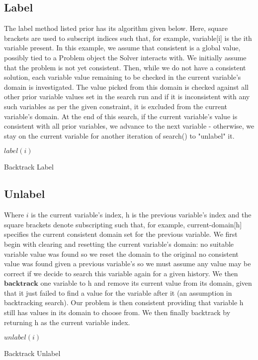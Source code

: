 \documentclass{article}
\begin{document}
\subsection*{Label}
The label method listed prior has its algorithm given below. Here, square brackets are used to subscript indices such that, for example, variable[i] is the ith variable present. In this example, we assume that consistent is a global value, possibly tied to a Problem object the Solver interacts with. We initially assume that the problem is not yet consistent. Then, while we do not have a consistent solution, each variable value remaining to be checked in the current variable's domain is investigated. The value picked from this domain is checked against all other prior variable values set in the search run and if it is inconsistent with any such variables as per the given constraint, it is excluded from the current variable's domain. At the end of this search, if the current variable's value is consistent with all prior variables, we advance to the next variable - otherwise, we stay on the current variable for another iteration of search() to "unlabel" it.
\begin{algorithm}[!htpb]
\DontPrintSemicolon
\nl $label(i)$\;
\nl {}
\caption{Backtrack Label}
\label{btLabel}
\end{algorithm}
\subsection*{Unlabel}
Where $i$ is the current variable's index, h is the previous variable's index and the square brackets denote subscripting such that, for example, current-domain[h] specifies the current consistent domain set for the previous variable. We first begin with clearing and resetting the current variable's domain: no suitable variable value was found so we reset the domain to the original no consistent value was found given a previous variable's so we must assume any value may be correct if we decide to search this variable again for a given history. We then $\textbf{backtrack}$ one variable to h and remove its current value from its domain, given that it just failed to find a value for the variable after it (an assumption in backtracking search). Our problem is then consistent providing that variable h still has values in its domain to choose from. We then finally backtrack by returning h as the current variable index.
\begin{algorithm}
\DontPrintSemicolon
\nl $unlabel(i)$\;
\nl {}
\caption{Backtrack Unlabel}
\label{btUnlabel}
\end{algorithm}
\end{document}
